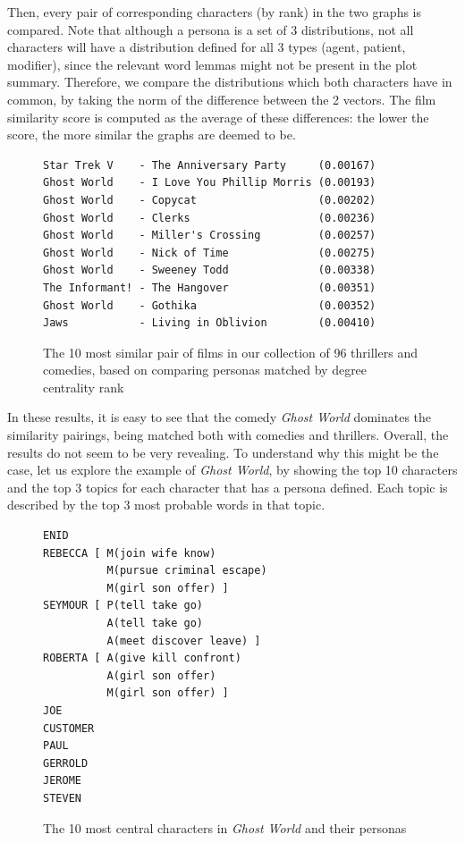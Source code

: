 \documentclass[bsc,frontabs,singlespacing,parskip]{infthesis} %
\begin{document}
Then, every pair of corresponding characters (by rank) in the two graphs is compared. Note that although a persona is a set of 3 distributions, not all characters will have a distribution defined for all 3 types (agent, patient, modifier), since the relevant word lemmas might not be present in the plot summary. Therefore, we compare the distributions which both characters have in common, by taking the norm of the difference between the 2 vectors. The film similarity score is computed as the average of these differences: the lower the score, the more similar the graphs are deemed to be.

\begin{figure}[h]
\centering
\begin{minipage}{11.5cm}
\begin{Verbatim}[frame=single]
Star Trek V    - The Anniversary Party     (0.00167)
Ghost World    - I Love You Phillip Morris (0.00193)
Ghost World    - Copycat                   (0.00202)
Ghost World    - Clerks                    (0.00236)
Ghost World    - Miller's Crossing         (0.00257)
Ghost World    - Nick of Time              (0.00275)
Ghost World    - Sweeney Todd              (0.00338)
The Informant! - The Hangover              (0.00351)
Ghost World    - Gothika                   (0.00352)
Jaws           - Living in Oblivion        (0.00410)
\end{Verbatim}
\end{minipage}
\caption{The 10 most similar pair of films in our collection of 96 thrillers and comedies, based on comparing personas matched by degree centrality rank}
\end{figure}

In these results, it is easy to see that the comedy \textit{Ghost World} dominates the similarity pairings, being matched both with comedies and thrillers. Overall, the results do not seem to be very revealing. To understand why this might be the case, let us explore the example of \textit{Ghost World}, by showing the top 10 characters and the top 3 topics for each character that has a persona defined. Each topic is described by the top 3 most probable words in that topic.

\begin{figure}[h]
\centering
\begin{minipage}{9cm}
\begin{Verbatim}[frame=single]
ENID 
REBECCA [ M(join wife know)
          M(pursue criminal escape)
          M(girl son offer) ]
SEYMOUR [ P(tell take go)
          A(tell take go)
          A(meet discover leave) ]
ROBERTA [ A(give kill confront)
          A(girl son offer)
          M(girl son offer) ]
JOE 
CUSTOMER 
PAUL 
GERROLD 
JEROME 
STEVEN 
\end{Verbatim}

\end{minipage}
\caption{The 10 most central characters in \textit{Ghost World} and their personas}
\end{figure}
\end{document}
